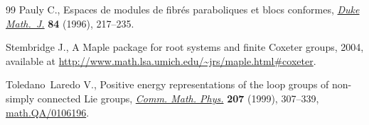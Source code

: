 \documentclass[pdftex]{sigma}
\numberwithin{equation}{section}
\begin{document}
\begin{thebibliography}{99}
Pauly C., Espaces de modules de f\/ibr\'es paraboliques et blocs conformes,
  \href{http://dx.doi.org/10.1215/S0012-7094-96-08408-2}{\textit{Duke Math.~J.}} \textbf{84} (1996), 217--235.

Stembridge J., A Maple package for root systems and f\/inite Coxeter groups,
  2004, available at
  \url{http://www.math.lsa.umich.edu/~jrs/maple.html#coxeter}.

Toledano~Laredo V., Positive energy representations of the loop groups of
  non-simply connected {L}ie groups, \href{http://dx.doi.org/10.1007/s002200050728}{\textit{Comm. Math. Phys.}} \textbf{207}
  (1999), 307--339, \href{http://arxiv.org/abs/math.QA/0106196}{math.QA/0106196}.

\end{thebibliography}\LastPageEnding
\end{document}

